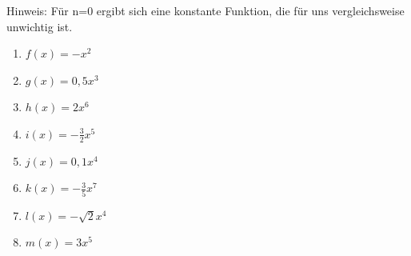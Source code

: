 \textcolor{loes}{Hinweis: Für n=0 ergibt sich eine konstante Funktion, die für uns vergleichsweise unwichtig ist.}
\newpage
\begin{Exercise}[title={Skizziere das Schaubild, gib die Symmetrie sowie das Verhalten für sehr große/kleine \(x\) an.}, label=potenzA1]

	\begin{minipage}{\textwidth}
		\begin{minipage}{0.5\textwidth}
			\begin{enumerate}[label=\alph*)]
				\item \(f(x)=-x^2\)
				\item \(g(x)=0,5x^3\)
				\item \(h(x)=2x^6\)
				\item \(i(x)=-\frac{3}{2}x^5\)
			\end{enumerate}
		\end{minipage}%
		\begin{minipage}{0.5\textwidth}
			\begin{enumerate}[label=\alph*)]
				\setcounter{enumi}{4}
				\item \(j(x)=0,1x^4\)
				\item \(k(x)=-\frac{3}{5}x^7\)
				\item \(l(x)=-\sqrt{2}x^4\)
				\item \(m(x)=3x^5\)
			\end{enumerate}
		\end{minipage}%
	\end{minipage}%
\end{Exercise}

